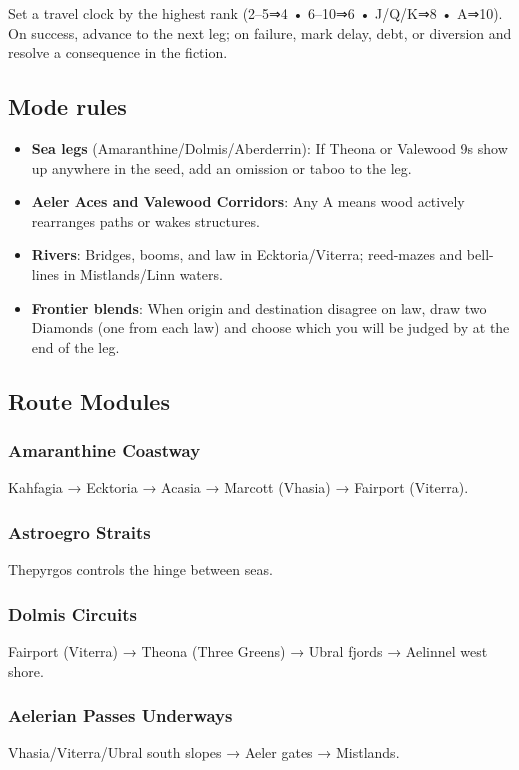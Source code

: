 \documentclass[11pt]{article}
\begin{document}
Set a travel clock by the highest rank (2–5⇒4 • 6–10⇒6 • J/Q/K⇒8 • A⇒10). On success, advance to the next leg; on failure, mark delay, debt, or diversion and resolve a consequence in the fiction.

\subsection{Mode rules}
\begin{itemize}
    \item \textbf{Sea legs} (Amaranthine/Dolmis/Aberderrin): If Theona or Valewood 9s show up anywhere in the seed, add an omission or taboo to the leg.
    \item \textbf{Aeler Aces and Valewood Corridors}: Any A means wood actively rearranges paths or wakes structures.
    \item \textbf{Rivers}: Bridges, booms, and law in Ecktoria/Viterra; reed-mazes and bell-lines in Mistlands/Linn waters.
    \item \textbf{Frontier blends}: When origin and destination disagree on law, draw two Diamonds (one from each law) and choose which you will be judged by at the end of the leg.
\end{itemize}

\subsection{Route Modules}
\subsubsection{Amaranthine Coastway}
Kahfagia → Ecktoria → Acasia → Marcott (Vhasia) → Fairport (Viterra).

\subsubsection{Astroegro Straits}
Thepyrgos controls the hinge between seas.

\subsubsection{Dolmis Circuits}
Fairport (Viterra) → Theona (Three Greens) → Ubral fjords → Aelinnel west shore.

\subsubsection{Aelerian Passes Underways}
Vhasia/Viterra/Ubral south slopes → Aeler gates → Mistlands.
\end{document}
